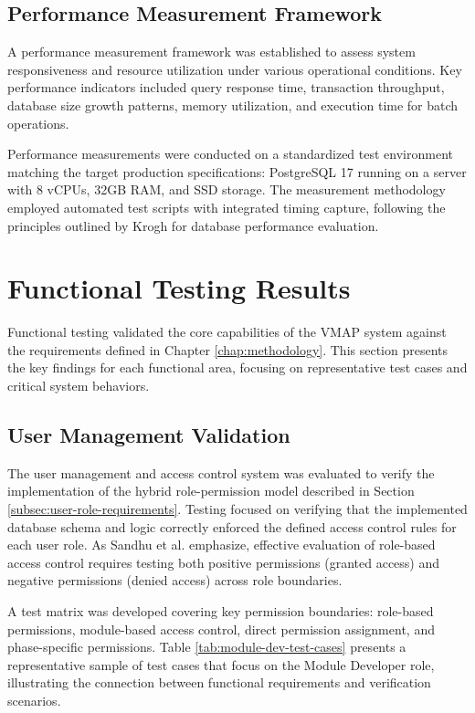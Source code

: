 \subsection{Performance Measurement Framework}
\label{subsec:performance-measurement-framework}

A performance measurement framework was established to assess system responsiveness and resource utilization under various operational conditions. Key performance indicators included query response time, transaction throughput, database size growth patterns, memory utilization, and execution time for batch operations.

Performance measurements were conducted on a standardized test environment matching the target production specifications: PostgreSQL 17 running on a server with 8 vCPUs, 32GB RAM, and SSD storage. The measurement methodology employed automated test scripts with integrated timing capture, following the principles outlined by Krogh \cite{kroghmysql} for database performance evaluation.

\section{Functional Testing Results}
\label{sec:functional-testing-results}

Functional testing validated the core capabilities of the \ac{VMAP} system against the requirements defined in Chapter \ref{chap:methodology}. This section presents the key findings for each functional area, focusing on representative test cases and critical system behaviors.

\subsection{User Management Validation}
\label{subsec:user-management-validation}

The user management and access control system was evaluated to verify the implementation of the hybrid role-permission model described in Section \ref{subsec:user-role-requirements}. Testing focused on verifying that the implemented database schema and logic correctly enforced the defined access control rules for each user role. As Sandhu et al. \cite{sandhu1998role} emphasize, effective evaluation of role-based access control requires testing both positive permissions (granted access) and negative permissions (denied access) across role boundaries.

A test matrix was developed covering key permission boundaries: role-based permissions, module-based access control, direct permission assignment, and phase-specific permissions. Table \ref{tab:module-dev-test-cases} presents a representative sample of test cases that focus on the Module Developer role, illustrating the connection between functional requirements and verification scenarios.


